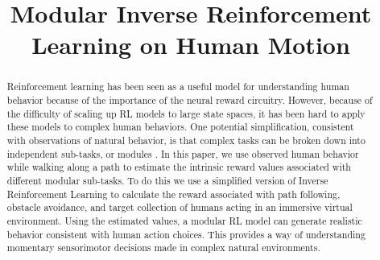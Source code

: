 \documentclass{article} %
\title{Modular Inverse Reinforcement Learning on Human Motion}
\begin{document}
\maketitle

\begin{abstract}
Reinforcement learning has been seen as a useful model for understanding human
behavior because of the importance of the neural reward circuitry. However,
because of the difficulty of scaling up RL models to large state spaces, it has
been hard to apply these models to complex human behaviors. One potential
simplification, consistent with observations of natural behavior, is that
complex tasks can be broken down into independent sub-tasks, or modules . In
this paper, we use observed human behavior while walking along a path to
estimate the intrinsic reward values associated with different modular
sub-tasks. To do this we use a simplified version of Inverse Reinforcement
Learning to calculate the reward associated with path following, obstacle
avoidance, and target collection of humans acting in an immersive virtual
environment. Using the estimated values, a modular RL model can generate
realistic behavior consistent with human action choices. This provides a way of
understanding momentary sensorimotor decisions made in complex natural
environments.
\end{abstract}









\end{document}
